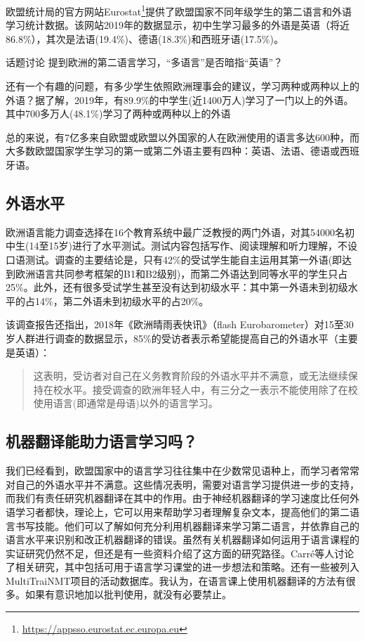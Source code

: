 \documentclass[output=paper]{langscibook}
\begin{document}
欧盟统计局的官方网站Eurostat\footnote{\url{https://appsso.eurostat.ec.europa.eu}}提供了欧盟国家不同年级学生的第二语言和外语学习统计数据。该网站2019年的数据显示，初中生学习最多的外语是英语（将近86.8\%），其次是法语(19.4\%)、德语(18.3\%)和西班牙语(17.5\%)\citep{Eurostat2022}。

\begin{tblsframed}{话题讨论}
提到欧洲的第二语言学习，“多语言”是否暗指“英语”？
\end{tblsframed}

还有一个有趣的问题，有多少学生依照欧洲理事会\citet{EuropeanCouncil2002}的建议，学习两种或两种以上的外语？据了解，2019年，有89.9\%的中学生(近1400万人)学习了一门以上的外语\citep{Eurostat2022}。‌其中700多万人(48.1\%)学习了两种或两种以上的外语

总的来说，有7亿多来自欧盟或欧盟以外国家的人\citep{WorldBank2020}在欧洲使用的语言多达600种，而大多数欧盟国家学生学习的第一或第二外语主要有四种：英语、法语、德语或西班牙语。

\subsection{外语水平}
欧洲语言能力调查\citep{EuropeanCommission2019}选择在16个教育系统中最广泛教授的两门外语，对其54000名初中生(14至15岁)进行了水平测试。测试内容包括写作、阅读理解和听力理解，不设口语测试。调查的主要结论是，只有42\%的受试学生能自主运用其第一外语(即达到欧洲语言共同参考框架的B1和B2级别)，而第二外语达到同等水平的学生只占25\%。‌此外，还有很多受试学生甚至没有达到初级水平：其中第一外语未到初级水平的占14\%，第二外语未到初级水平的占20\%\citep{EuropeanCommission2019}。

‌该调查报告还指出，2018年《欧洲晴雨表快讯》（flash Eurobarometer）对15至30岁人群进行调查的数据显示，85\%的受访者表示希望能提高自己的外语水平（主要是英语）：

\begin{quote}
这表明，受访者对自己在义务教育阶段的外语水平并不满意，或无法继续保持在校水平。‌接受调查的欧洲年轻人中，有三分之一表示不能使用除了在校使用语言(即通常是母语)以外的语言学习。\citep[102]{EuropeanCommission2019}  
\end{quote}



\subsection{机器翻译能助力语言学习吗？}
我们已经看到，欧盟国家中的语言学习往往集中在少数常见语种上，而学习者常常对自己的外语水平并不满意。这些情况表明，需要对语言学习提供进一步的支持，而我们有责任研究机器翻译在其中的作用。‌由于神经机器翻译的学习速度比任何外语学习者都快，理论上，它可以用来帮助学习者理解复杂文本，提高他们的第二语言书写技能。他们可以了解如何充分利用机器翻译来学习第二语言，并依靠自己的语言水平来识别和改正机器翻译的错误。虽然有关机器翻译如何运用于语言课程的实证研究仍然不足，但还是有一些资料介绍了这方面的研究路径。‌Carré等人讨论了相关研究，其中包括可用于语言学习课堂的进一步想法和策略。‌还有一些被列入MultiTraiNMT项目的活动数据库\citep{MultiTraiNMT2020}。我认为，在语言课上使用机器翻译的方法有很多。如果有意识地加以批判使用，就没有必要禁止。
\end{document}

